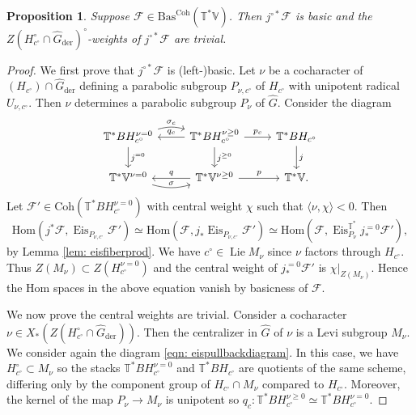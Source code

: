 \documentclass{amsart}
\newtheorem{proposition}[theorem]{Proposition}
\theoremstyle{definition}
\theoremstyle{remark}
\numberwithin{equation}{section}
\DeclareMathOperator{\Lie}{Lie}
\newcommand{\der}{\mathrm{der}}
\newcommand{\mc}{\mathcal}
\newcommand{\Hom}{\mathrm{Hom}}
\newcommand{\wh}{\widehat}
\DeclareMathOperator{\Eis}{\mathrm{Eis}}
\newcommand{\Coh}{\mathrm{Coh}}
\newcommand{\V}{\mathbb{V}}
\newcommand{\T}{\mathbb{T}}
\newcommand{\Bas}{\mathrm{Bas}}
\begin{document}
\begin{proposition}{\label{prop: basrestrictisbas}}
   Suppose $\mc{F} \in \Bas^{\Coh}(\T^{\ast}\V)$. Then $j^{\circ \ast} \mc{F}$ is basic and the $Z(H^{\circ}_{c^{\circ}} \cap \wh{G}_{\der})^{\circ}$-weights of $j^{\circ \ast} \mc{F}$ are trivial.
\end{proposition}
\begin{proof}
We first prove that $j^{\circ\ast} \mc{F}$ is (left-)basic. Let $\nu$ be a cocharacter of $(H_{c^{\circ}})\cap \wh G_{\der}$ defining a parabolic subgroup $P_{\nu, c^{\circ}}$ of $H_{c^{\circ}}$ with unipotent radical $U_{\nu, c^{\circ}}$. Then $\nu$ determines a parabolic subgroup $P_{\nu}$ of $\wh{G}$.   Consider the diagram
\begin{equation}{\label{eqn: eispullbackdiagram}}
    \begin{tikzcd}
\T^{\ast}BH_{c^{\circ}}^{\nu = 0} \arrow[d, "j^{=0}"] \arrow[r, "\sigma_c", bend left = 15]& \T^{\ast}BH_{c^{\circ}}^{\nu \geq 0} \arrow[r, "p_c"] \arrow[d, "j^{\geq 0}"] \arrow[l, swap, "q_c"]&  \T^{\ast}BH_{c^{\circ}} \arrow[d, "j"] \\
 \T^{\ast}\V^{\nu = 0} \arrow[r, "\sigma", bend right = 15] & \T^{\ast}\V^{\nu \geq 0} \arrow[r, "p"] \arrow[l, swap, "q"] & \T^{\ast}\V .
    \end{tikzcd}
\end{equation}
Let $\mc{F}' \in \Coh(\T^{\ast}BH^{\nu = 0}_{c^{\circ}})$ with central weight $\chi$ such that $\langle \nu, \chi \rangle < 0$. Then
\begin{equation*}
    \Hom(j^{\ast}\mc{F}, \Eis_{P_{\nu, c^{\circ}}} \mc{F}') \simeq \Hom(\mc{F}, j_{\ast}\Eis_{P_{\nu, c^{\circ}}} \mc{F}') \simeq \Hom(\mc{F}, \Eis^{\T^*}_{P_{\nu}} j^{=0}_{\ast}\mc{F}'),
\end{equation*}
by Lemma \ref{lem: eisfiberprod}. We have $c^{\circ} \in \Lie M_{\nu}$ since $\nu$ factors through $H_{c^{\circ}}$. Thus $Z(M_{\nu}) \subset Z(H^{\nu = 0}_{c^{\circ}})$ and the central weight of $j^{=0}_{\ast} \mc{F}'$ is $\chi|_{Z(M_{\nu})}$. Hence the Hom spaces in the above equation vanish by basicness of $\mc{F}$.

We now prove the central weights are trivial. Consider a cocharacter $\nu \in X_{\ast}(Z(H^{\circ}_{c^{\circ}} \cap \wh{G}_{\der}))$. Then the centralizer in $\wh{G}$ of $\nu$ is a Levi subgroup $M_{\nu}$. We consider again the diagram \eqref{eqn: eispullbackdiagram}. In this case, we have $H^{\circ}_{c^{\circ}} \subset M_{\nu}$ so the stacks $\T^{\ast}BH_{c^{\circ}}^{\nu = 0}$ and $\T^{\ast}BH_{c^{\circ}}$ are quotients of the same scheme, differing only by the component group of $H_{c^{\circ}} \cap M_{\nu}$ compared to $H_{c^{\circ}}$. Moreover, the kernel of the map $P_{\nu} \rightarrow M_{\nu}$ is unipotent so $q_c\colon \T^{\ast}BH_{c^{\circ}}^{\nu \geq 0} \simeq \T^{\ast}BH_{c^{\circ}}^{\nu = 0}$.


\end{proof}
\end{document}
